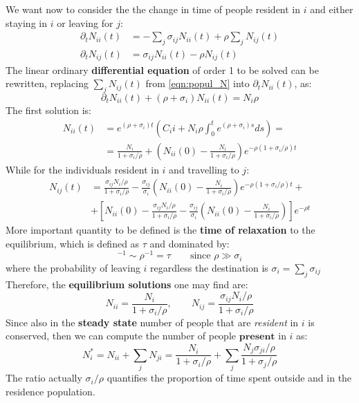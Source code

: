 \documentclass[../main/main.tex]{subfiles}
\begin{document}
We want now to consider the the change in time of people resident in $i$ and either staying in $i$ or leaving for $j$:
\begin{subequations}
\begin{align}
    \partial_t N_{ii}(t) &= - \sum_{j} \sigma_{ij} N_{ii}(t) + \rho \sum_{j} N_{ij} (t)\\
    \partial_t N_{ij}(t) &= \sigma_{ij} N_{ii}(t) - \rho N_{ij}(t)
\end{align}
\end{subequations}
The linear ordinary \textbf{differential equation} of order 1 to be solved can be rewritten, replacing $\sum_{j} N_{ij}(t)$ from \ref{eqn:popul_N} into $\partial_t N_{ii}(t)$, as:
\begin{equation}
    \partial_t N_{ii} (t) + (\rho + \sigma_i) N_{ii}(t) = N_i \rho
\end{equation}
The first solution is:
\begin{equation}
\begin{split}
    N_{ii}(t) &= e^{(\rho + \sigma_i)t}\left( C_ii + N_i \rho \int_0^t e^{(\rho + \sigma_i)s}ds \right)=\\
     &= \frac{N_i}{1+\sigma_i/\rho} + \left( N_{ii}(0) - \frac{N_i}{1+\sigma_i/\rho} \right) e^{-\rho(1+\sigma_i/\rho)t}
\end{split}
\end{equation}
While for the individuals resident in $i$ and travelling to $j$:
\begin{equation}
\begin{split}
    N_{ij}(t) &= \frac{\sigma_{ij}N_i/\rho}{1+\sigma_i/\rho} - \frac{\sigma_{ij}}{\sigma_i} \left( N_{ii}(0) - \frac{N_i}{1+\sigma_i/\rho} \right) e^{-\rho(1+\sigma_i/\rho)t} +\\
    &+ \left[ N_{ii}(0) - \frac{\sigma_{ij}N_i/\rho}{1+\sigma_i/\rho} -\frac{\sigma_{ij}}{\sigma_i} \left( N_{ii}(0) - \frac{N_i}{1+\sigma_i/\rho} \right)\right] e^{-\rho t}
\end{split}
\end{equation}
More important quantity to be defined is the \textbf{time of relaxation} to the equilibrium, which is defined as $\tau$ and dominated by:
\begin{equation}
    [\rho(1+\sigma_i/\rho)]^{-1} \sim \rho^{-1} = \tau \qquad \text{since } \rho \gg \sigma_i
\end{equation}
where the probability of leaving $i$ regardless the destination is $\sigma_i = \sum_{j} \sigma_{ij}$
Therefore, the \textbf{equilibrium solutions} one may find are:
\begin{equation}
    N_{ii} = \frac{N_i}{1+\sigma_i/\rho}, \qquad N_{ij} = \frac{\sigma_{ij}N_i/\rho}{1+\sigma_i/\rho}
\end{equation}
Since also in the \textbf{steady state} number of people that are \textit{resident} in $i$ is conserved, then we can compute the number of people $\textbf{present}$ in $i$ as:
\begin{equation}
    N_i^* = N_{ii} + \sum_{j}N_{ji} = \frac{N_i}{1+\sigma_i/\rho} + \sum_j \frac{N_j \sigma_{ji}/\rho}{1+\sigma_j/\rho}
    \label{eqn:N^*}
\end{equation}
The ratio actually $\sigma_i/\rho$ quantifies the proportion of time spent outside and in the residence population.
\end{document}
